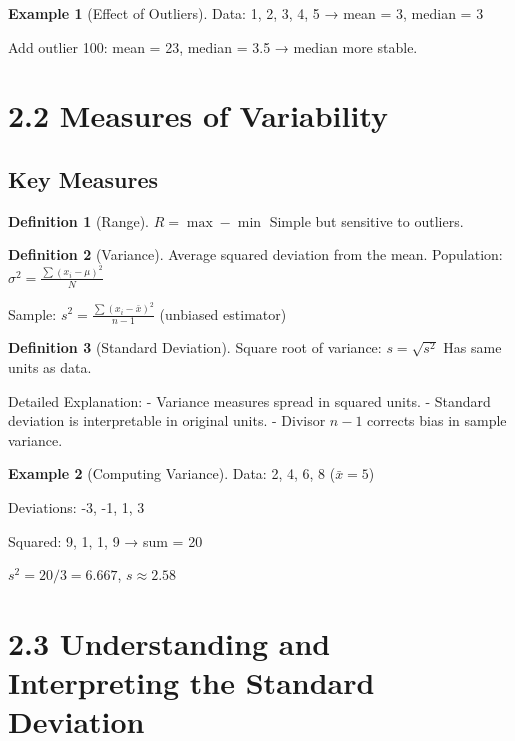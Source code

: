 \documentclass{article}
\theoremstyle{definition}
\newtheorem{definition}{Definition}
\newtheorem{example}{Example}
\begin{document}
	\begin{example}[Effect of Outliers]
		Data: 1, 2, 3, 4, 5 → mean = 3, median = 3
		
		Add outlier 100: mean = 23, median = 3.5 → median more stable.
	\end{example}
	
	\section{2.2 Measures of Variability}
	
	\subsection{Key Measures}
	
	\begin{definition}[Range]
		\(R = \max - \min\)
		Simple but sensitive to outliers.
	\end{definition}
	
	\begin{definition}[Variance]
		Average squared deviation from the mean.
		Population: \(\sigma^2 = \frac{\sum (x_i - \mu)^2}{N}\)
		
		Sample: \(s^2 = \frac{\sum (x_i - \bar{x})^2}{n-1}\) (unbiased estimator)
	\end{definition}
	
	\begin{definition}[Standard Deviation]
		Square root of variance: \(s = \sqrt{s^2}\)
		Has same units as data.
	\end{definition}
	
	Detailed Explanation: 
	- Variance measures spread in squared units.
	- Standard deviation is interpretable in original units.
	- Divisor \(n-1\) corrects bias in sample variance.
	
	\begin{example}[Computing Variance]
		Data: 2, 4, 6, 8 (\(\bar{x} = 5\))
		
		Deviations: -3, -1, 1, 3
		
		Squared: 9, 1, 1, 9 → sum = 20
		
		\(s^2 = 20 / 3 = 6.667\), \(s \approx 2.58\)
	\end{example}
	
	\section{2.3 Understanding and Interpreting the Standard Deviation}
	
\end{document}
